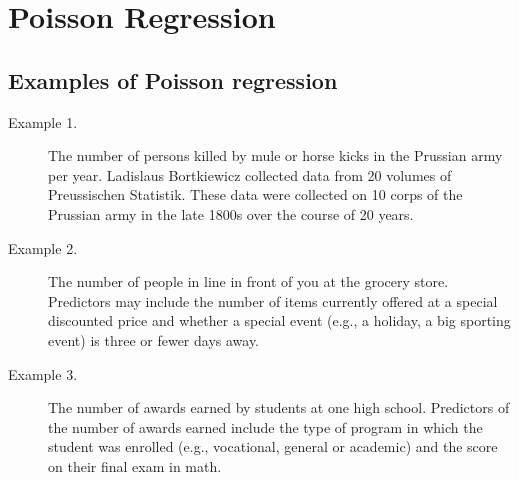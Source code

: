 

\section{Poisson Regression}
\subsection{Examples of Poisson regression}
\begin{description}
\item[Example 1.] The number of persons killed by mule or horse kicks in the Prussian army per year. Ladislaus Bortkiewicz collected data from 20 volumes of Preussischen Statistik. These data were collected on 10 corps of the Prussian army in the late 1800s over the course of 20 years.

\item[Example 2.] The number of people in line in front of you at the grocery store. Predictors may include the number of items currently offered at a special discounted price and whether a special event (e.g., a holiday, a big sporting event) is three or fewer days away.

\item[Example 3.] The number of awards earned by students at one high school. Predictors of the number of awards earned include the type of program in which the student was enrolled (e.g., vocational, general or academic) and the score on their final exam in math.

\end{description}


